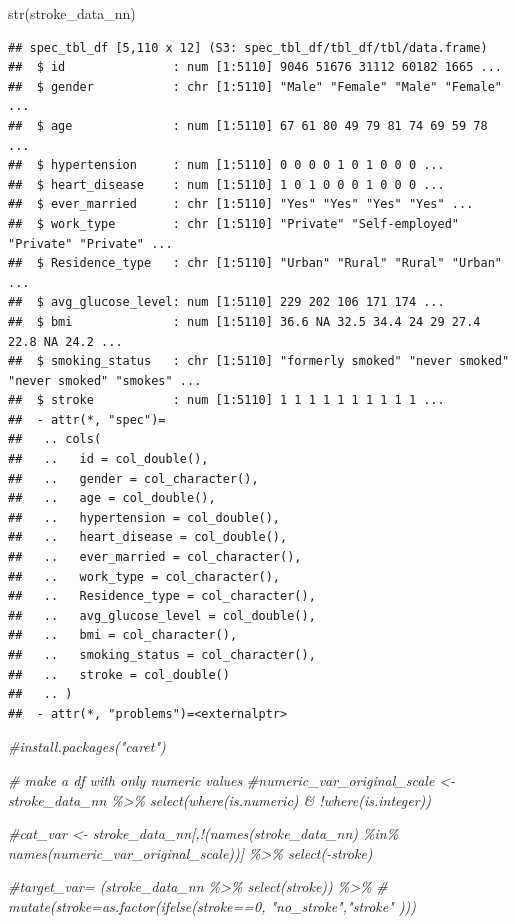 \documentclass[
]{article}
\newenvironment{Shaded}{\begin{snugshade}}{\end{snugshade}}
\newcommand{\CommentTok}[1]{\textcolor[rgb]{0.56,0.35,0.01}{\textit{#1}}}
\newcommand{\FunctionTok}[1]{\textcolor[rgb]{0.00,0.00,0.00}{#1}}
\newcommand{\NormalTok}[1]{#1}
\renewcommand{\=}[1]{\stackrel{#1}{=}}
\theoremstyle{definition}
\theoremstyle{remark}
\begin{document}
\begin{Shaded}
\begin{Highlighting}[]
\FunctionTok{str}\NormalTok{(stroke\_data\_nn)}
\end{Highlighting}
\end{Shaded}

\begin{verbatim}
## spec_tbl_df [5,110 x 12] (S3: spec_tbl_df/tbl_df/tbl/data.frame)
##  $ id               : num [1:5110] 9046 51676 31112 60182 1665 ...
##  $ gender           : chr [1:5110] "Male" "Female" "Male" "Female" ...
##  $ age              : num [1:5110] 67 61 80 49 79 81 74 69 59 78 ...
##  $ hypertension     : num [1:5110] 0 0 0 0 1 0 1 0 0 0 ...
##  $ heart_disease    : num [1:5110] 1 0 1 0 0 0 1 0 0 0 ...
##  $ ever_married     : chr [1:5110] "Yes" "Yes" "Yes" "Yes" ...
##  $ work_type        : chr [1:5110] "Private" "Self-employed" "Private" "Private" ...
##  $ Residence_type   : chr [1:5110] "Urban" "Rural" "Rural" "Urban" ...
##  $ avg_glucose_level: num [1:5110] 229 202 106 171 174 ...
##  $ bmi              : num [1:5110] 36.6 NA 32.5 34.4 24 29 27.4 22.8 NA 24.2 ...
##  $ smoking_status   : chr [1:5110] "formerly smoked" "never smoked" "never smoked" "smokes" ...
##  $ stroke           : num [1:5110] 1 1 1 1 1 1 1 1 1 1 ...
##  - attr(*, "spec")=
##   .. cols(
##   ..   id = col_double(),
##   ..   gender = col_character(),
##   ..   age = col_double(),
##   ..   hypertension = col_double(),
##   ..   heart_disease = col_double(),
##   ..   ever_married = col_character(),
##   ..   work_type = col_character(),
##   ..   Residence_type = col_character(),
##   ..   avg_glucose_level = col_double(),
##   ..   bmi = col_character(),
##   ..   smoking_status = col_character(),
##   ..   stroke = col_double()
##   .. )
##  - attr(*, "problems")=<externalptr>
\end{verbatim}

\begin{Shaded}
\begin{Highlighting}[]
\CommentTok{\#install.packages("caret")}
\end{Highlighting}
\end{Shaded}

\begin{Shaded}
\begin{Highlighting}[]
\CommentTok{\# make a df with only numeric values}
\CommentTok{\#numeric\_var\_original\_scale \textless{}{-} stroke\_data\_nn \%\textgreater{}\% select(where(is.numeric) \& !where(is.integer))}

\CommentTok{\#cat\_var \textless{}{-} stroke\_data\_nn[,!(names(stroke\_data\_nn) \%in\% names(numeric\_var\_original\_scale))] \%\textgreater{}\% select({-}stroke)}

\CommentTok{\#target\_var= (stroke\_data\_nn \%\textgreater{}\% select(stroke)) \%\textgreater{}\% }
\CommentTok{\#  mutate(stroke=as.factor(ifelse(stroke==0, "no\_stroke","stroke" )))}
\end{Highlighting}
\end{Shaded}
\end{document}
